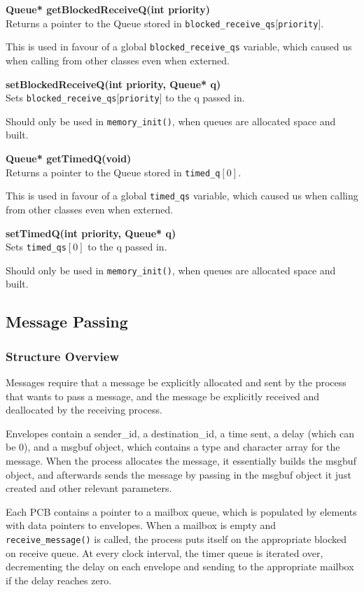 \documentclass[11pt, oneside]{article}
\begin{document}
{\bf Queue* getBlockedReceiveQ(int priority)}\\
Returns a pointer to the Queue stored in {\tt blocked\_receive\_qs$[$priority$]$}.

This is used in favour of a global {\tt blocked\_receive\_qs} variable, which caused us when calling from other classes even when externed.

{\bf setBlockedReceiveQ(int priority, Queue* q)}\\
Sets {\tt blocked\_receive\_qs$[$priority$]$} to the q passed in.

Should only be used in {\tt memory\_init()}, when queues are allocated space and built.

{\bf Queue* getTimedQ(void)}\\
Returns a pointer to the Queue stored in {\tt timed\_q$[0]$}.

This is used in favour of a global {\tt timed\_qs} variable, which caused us when calling from other classes even when externed.

{\bf setTimedQ(int priority, Queue* q)}\\
Sets {\tt timed\_qs$[0]$} to the q passed in.

Should only be used in {\tt memory\_init()}, when queues are allocated space and built.

\subsection{Message Passing}
\subsubsection{Structure Overview}
Messages require that a message be explicitly allocated and sent by the process that wants to pass a message, and the message be explicitly received and deallocated by the receiving process.

Envelopes contain a sender\_id, a destination\_id, a time sent, a delay (which can be 0), and a msgbuf object, which contains a type and character array for the message. When the process allocates the message, it essentially builds the msgbuf object, and afterwards sends the message by passing in the msgbuf object it just created and other relevant parameters.

Each PCB contains a pointer to a mailbox queue, which is populated by elements with data pointers to envelopes. When a mailbox is empty and {\tt receive\_message()} is called, the process puts itself on the appropriate blocked on receive queue. At every clock interval, the timer queue is iterated over, decrementing the delay on each envelope and sending to the appropriate mailbox if the delay reaches zero.
\end{document}
